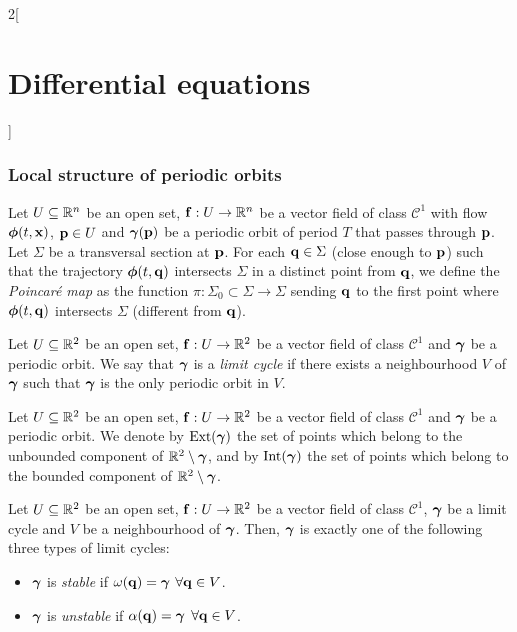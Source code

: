 \documentclass[../../../main.tex]{subfiles}
\begin{document}
\begin{multicols}{2}[\section{Differential equations}]
  \subsubsection{Local structure of periodic orbits}
  \begin{definition}
    Let $U\subseteq \mathbb{R}^n$ be an open set, $\boldsymbol{\mathrm{f}}:U\rightarrow\mathbb{R}^n$ be a vector field of class $\mathcal{C}^1$ with flow $\boldsymbol{\mathrm{\phi}}(t,\boldsymbol{\mathrm{x}})$, $\boldsymbol{\mathrm{p}}\in U$ and $\boldsymbol{\mathrm{\gamma}}(\boldsymbol{\mathrm{p}})$ be a periodic orbit of period $T$ that passes through $\boldsymbol{\mathrm{p}}$. Let $\Sigma$ be a transversal section at $\boldsymbol{\mathrm{p}}$. For each $\boldsymbol{\mathrm{q}}\in\Sigma$ (close enough to $\boldsymbol{\mathrm{p}}$) such that the trajectory $\boldsymbol{\mathrm{\phi}}(t,\boldsymbol{\mathrm{q}})$ intersects $\Sigma$ in a distinct point from $\boldsymbol{\mathrm{q}}$, we define the \emph{Poincaré map} as the function $\pi:\Sigma_0\subset \Sigma\rightarrow\Sigma$ sending $\boldsymbol{\mathrm{q}}$ to the first point where $\boldsymbol{\mathrm{\phi}}(t,\boldsymbol{\mathrm{q}})$ intersects $\Sigma$ (different from $\boldsymbol{\mathrm{q}}$).
  \end{definition}
  \begin{definition}
    Let $U\subseteq \mathbb{R}^2$ be an open set, $\boldsymbol{\mathrm{f}}:U\rightarrow\mathbb{R}^2$ be a vector field of class $\mathcal{C}^1$ and $\boldsymbol{\mathrm{\gamma}}$ be a periodic orbit. We say that $\boldsymbol{\mathrm{\gamma}}$ is a \emph{limit cycle} if there exists a neighbourhood $V$ of $\boldsymbol{\mathrm{\gamma}}$ such that $\boldsymbol{\mathrm{\gamma}}$ is the only periodic orbit in $V$.
  \end{definition}
  \begin{definition}
    Let $U\subseteq \mathbb{R}^2$ be an open set, $\boldsymbol{\mathrm{f}}:U\rightarrow\mathbb{R}^2$ be a vector field of class $\mathcal{C}^1$ and $\boldsymbol{\mathrm{\gamma}}$ be a periodic orbit. We denote by $\operatorname{Ext}(\boldsymbol{\mathrm{\gamma}})$ the set of points which belong to the unbounded component of $\mathbb{R}^2\setminus\boldsymbol{\mathrm{\gamma}}$, and by $\operatorname{Int}(\boldsymbol{\mathrm{\gamma}})$ the set of points which belong to the bounded component of $\mathbb{R}^2\setminus\boldsymbol{\mathrm{\gamma}}$.
  \end{definition}
  \begin{proposition}
    Let $U\subseteq \mathbb{R}^2$ be an open set, $\boldsymbol{\mathrm{f}}:U\rightarrow\mathbb{R}^2$ be a vector field of class $\mathcal{C}^1$, $\boldsymbol{\mathrm{\gamma}}$ be a limit cycle and $V$ be a neighbourhood of $\boldsymbol{\mathrm{\gamma}}$. Then, $\boldsymbol{\mathrm{\gamma}}$ is exactly one of the following three types of limit cycles:
    \begin{itemize}
      \item $\boldsymbol{\mathrm{\gamma}}$ is \emph{stable} if $\omega(\boldsymbol{\mathrm{q}})=\boldsymbol{\mathrm{\gamma}}$ $\forall \boldsymbol{\mathrm{q}}\in V$.
      \item $\boldsymbol{\mathrm{\gamma}}$ is \emph{unstable} if $\alpha(\boldsymbol{\mathrm{q}})=\boldsymbol{\mathrm{\gamma}}$ $\forall \boldsymbol{\mathrm{q}}\in V$.

\end{itemize}
\end{proposition}
\end{multicols}
\end{document}
